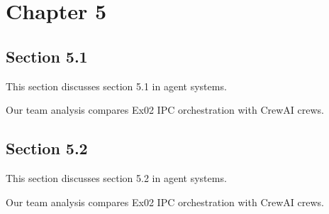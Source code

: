 \section{Chapter 5}

\subsection{Section 5.1}
This section discusses section 5.1 in agent systems. \cite{crewai2024}

Our team analysis compares Ex02 IPC orchestration with CrewAI crews. \cite{crewai2024}

\subsection{Section 5.2}
This section discusses section 5.2 in agent systems. \cite{crewai2024}

Our team analysis compares Ex02 IPC orchestration with CrewAI crews. \cite{crewai2024}
